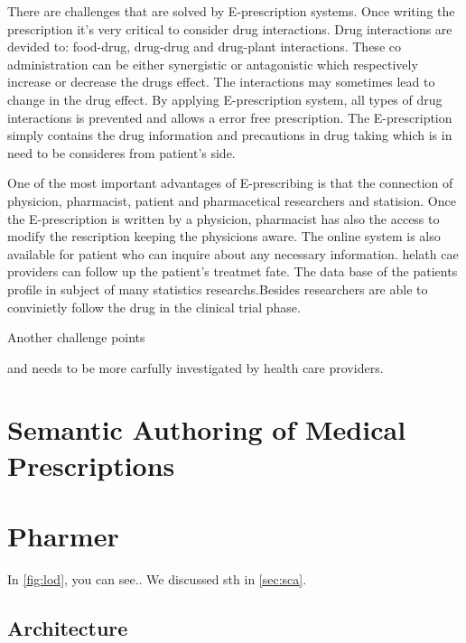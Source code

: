 \documentclass[10pt, conference, compsocconf]{IEEEtran}
\begin{document}
There are challenges that are solved by E-prescription systems.
Once writing the prescription it's very critical to consider drug interactions. 
Drug interactions are devided to: food-drug, drug-drug and drug-plant interactions.
These co administration can be either synergistic or antagonistic which respectively increase or decrease the drugs effect. 
The interactions may sometimes lead to change in the drug effect.
By applying E-prescription system, all types of drug interactions is prevented and allows a error free prescription.
The E-prescription simply contains the drug information and precautions in drug taking which is in need to be consideres from patient's side.

One of the most important advantages of E-prescribing is that the connection of physicion, pharmacist, patient and pharmacetical researchers and statision.
Once the E-prescription is written by a physicion, pharmacist has also the access to  modify the rescription keeping the physicions aware.
The online system is also available for patient who can inquire about any necessary information. 
helath cae providers can follow up the patient's treatmet fate. 
The data base of the patients profile in subject of many statistics researchs.Besides researchers are able to convinietly follow the drug in the clinical trial phase.


Another challenge points 

 and needs to be more carfully investigated by health care providers. 



\section{Semantic Authoring of Medical Prescriptions}

\section{Pharmer}
In \autoref{fig:lod}, you can see..
We discussed sth in \autoref{sec:sca}.

\subsection{Architecture}
\end{document}
